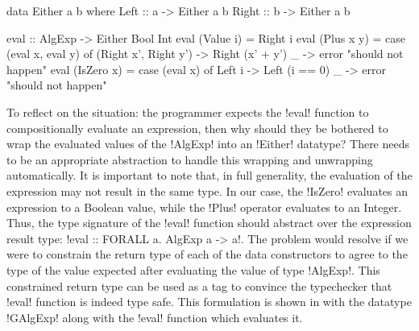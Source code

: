 \documentclass[screen,nonacm,manuscript,review]{acmart} %
\begin{document}
\begin{minipage}{0.3\linewidth}
\begin{CenteredBox}
\begin{code}
data Either a b where
    Left  :: a  -> Either a b
    Right :: b  -> Either a b

\end{code}
\end{CenteredBox}
\end{minipage}%
\begin{minipage}{0.6\linewidth}
\begin{CenteredBox}
\begin{code}
eval :: AlgExp -> Either Bool Int
eval (Value i) = Right i
eval (Plus x y) =
  case (eval x, eval y) of
    (Right x', Right y') -> Right (x' + y')
    _                    -> error "should not happen"
eval (IsZero x) = case (eval x) of
                    Left i -> Left (i == 0)
                    _      -> error "should not happen"
\end{code}
\end{CenteredBox}
\end{minipage}

To reflect on the situation: the programmer
expects the !eval! function to compositionally evaluate an
expression, then why should they be bothered to wrap the
evaluated values of the !AlgExp! into an !Either! datatype?
There needs to be an appropriate abstraction to handle
this wrapping and unwrapping automatically.
It is important to note that, in full generality,
the evaluation of the expression may not result in the same type.
In our case, the !IsZero! evaluates
an expression to a Boolean value, while the !Plus! operator evaluates
to an Integer. Thus, the type signature of the !eval! function should
abstract over the expression result type:
!eval :: FORALL a. AlgExp a -> a!. The problem
would resolve if we were to constrain the return type of each of the
data constructors to agree to the type of the value expected after
evaluating the value of type !AlgExp!. This constrained return type
can be used as a tag to convince the typechecker that !eval! function
is indeed type safe. This formulation is shown in
 with the datatype !GAlgExp! along with the !eval!
function which evaluates it.
\end{document}
